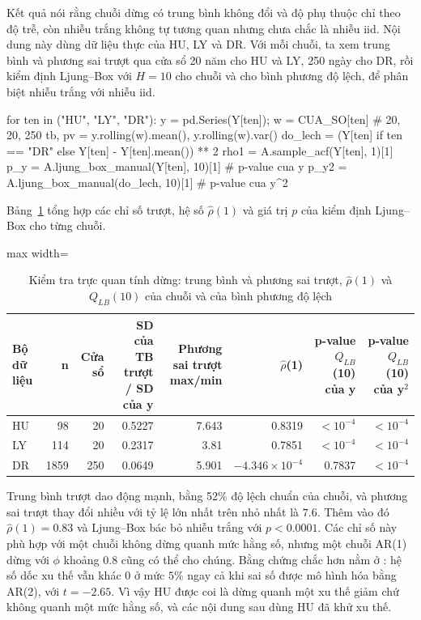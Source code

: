  Kết quả  nói rằng chuỗi dừng có trung bình không đổi và độ phụ thuộc chỉ theo độ trễ, còn nhiễu trắng không tự tương quan nhưng chưa chắc là nhiễu iid.
 Nội dung này dùng dữ liệu thực của HU, LY và DR. Với mỗi chuỗi, ta xem trung bình và phương sai trượt qua cửa sổ 20 năm cho HU và LY, 250 ngày cho DR, rồi kiểm định Ljung--Box với $H=10$ cho chuỗi và cho bình phương độ lệch, để phân biệt nhiễu trắng với nhiễu iid.
\begin{codeblock}
for ten in ("HU", "LY", "DR"):
    y = pd.Series(Y[ten]); w = CUA_SO[ten]                 # 20, 20, 250
    tb, pv = y.rolling(w).mean(), y.rolling(w).var()
    do_lech = (Y[ten] if ten == "DR" else Y[ten] - Y[ten].mean()) ** 2
    rho1 = A.sample_acf(Y[ten], 1)[1]
    p_y = A.ljung_box_manual(Y[ten], 10)[1]                # p-value cua y
    p_y2 = A.ljung_box_manual(do_lech, 10)[1]              # p-value cua y^2
\end{codeblock}
 Bảng~\ref{tab:tab_b11_01_stationarity} tổng hợp các chỉ số trượt, hệ số $\hat\rho(1)$ và giá trị $p$ của kiểm định Ljung--Box cho từng chuỗi.
\begin{table}[H]
\centering\footnotesize
\caption{Kiểm tra trực quan tính dừng: trung bình và phương sai trượt, $\hat\rho(1)$ và $Q_{LB}(10)$ của chuỗi và của bình phương độ lệch}\label{tab:tab_b11_01_stationarity}
\begin{adjustbox}{max width=\linewidth}
\begin{tabular}{|l|r|r|r|r|r|r|r|}
\toprule
Bộ dữ liệu & n & Cửa sổ & SD của TB trượt / SD của y & Phương sai trượt max/min & $\hat{\rho}$(1) & p-value $Q_{LB}$(10) của y & p-value $Q_{LB}$(10) của y$^{2}$ \\
\midrule
HU & 98 & 20 & 0.5227 & 7.643 & 0.8319 & $<10^{-4}$ & $<10^{-4}$ \\
LY & 114 & 20 & 0.2317 & 3.81 & 0.7851 & $<10^{-4}$ & $<10^{-4}$ \\
DR & 1859 & 250 & 0.0649 & 5.901 & $-4.346\times10^{-4}$ & 0.7837 & $<10^{-4}$ \\
\bottomrule
\end{tabular}
\end{adjustbox}\par{}
\end{table}
 Trung bình trượt dao động mạnh, bằng 52\% độ lệch chuẩn của chuỗi, và phương sai trượt thay đổi nhiều với tỷ lệ lớn nhất trên nhỏ nhất là $7.6$. Thêm vào đó $\hat\rho(1)=0.83$ và Ljung--Box bác bỏ nhiễu trắng với $p<0.0001$. Các chỉ số này phù hợp với một chuỗi không dừng quanh mức hằng số, nhưng một chuỗi AR(1) dừng với $\phi$ khoảng $0.8$ cũng có thể cho chúng. Bằng chứng chắc hơn nằm ở : hệ số dốc xu thế vẫn khác $0$ ở mức $5\%$ ngay cả khi sai số được mô hình hóa bằng AR(2), với $t=-2.65$. Vì vậy HU được coi là dừng quanh một xu thế giảm chứ không quanh một mức hằng số, và các nội dung sau dùng HU đã khử xu thế.

